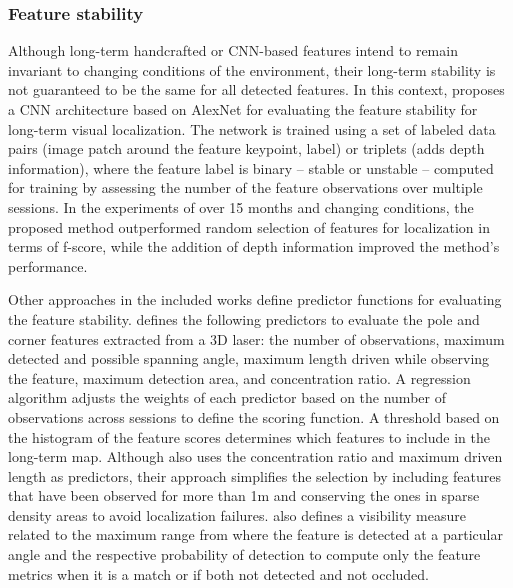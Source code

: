 \subsubsection{Feature stability}

Although long-term handcrafted or CNN-based features intend to remain invariant to changing conditions of the environment, their long-term stability is not guaranteed to be the same for all detected features. In this context, \cite{dymczyk-et-al:2016:66} proposes a CNN architecture based on AlexNet for evaluating the feature stability for long-term visual localization. The network is trained using a set of labeled data pairs (image patch around the feature keypoint, label) or triplets (adds depth information), where the feature label is binary -- stable or unstable -- computed for training by assessing the number of the feature observations over multiple sessions. In the experiments of over 15 months and changing conditions, the proposed method outperformed random selection of features for localization in terms of f-score, while the addition of depth information improved the method's performance.

Other approaches in the included works define predictor functions for evaluating the feature stability.
\cite{berrio-et-al:2019:8814289} defines the following predictors to evaluate the pole and corner features extracted from a 3D laser: the number of observations, maximum detected and possible spanning angle, maximum length driven while observing the feature, maximum detection area, and concentration ratio. A regression algorithm adjusts the weights of each predictor based on the number of observations across sessions to define the scoring function. A threshold based on the histogram of the feature scores determines which features to include in the long-term map.
Although \cite{berrio-et-al:2021:3094485} also uses the concentration ratio and maximum driven length as predictors, their approach simplifies the selection by including features that have been observed for more than 1m and conserving the ones in sparse density areas to avoid localization failures. \cite{berrio-et-al:2021:3094485} also defines a visibility measure related to the maximum range from where the feature is detected at a particular angle and the respective probability of detection to compute only the feature metrics when it is a match or if both not detected and not occluded.

